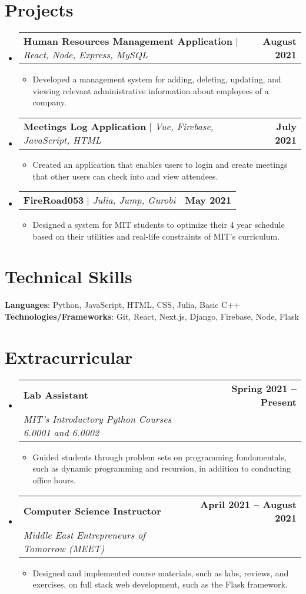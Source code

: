 \documentclass[letterpaper,11pt]{article}
\makeatletter
\newcommand{\resumeItem}[1]{
  \item\small{
    {#1 \vspace{-2pt}}
  }
}
\newcommand{\resumeSubheading}[4]{
  \vspace{-2pt}\item
    \begin{tabular*}{1.0\textwidth}[t]{l@{\extracolsep{\fill}}r}
      \textbf{#1} & \textbf{\small #2} \\
      \textit{\small#3} & \textit{\small #4} \\
    \end{tabular*}\vspace{-7pt}
}
\newcommand{\resumeProjectHeading}[2]{
    \item
    \begin{tabular*}{1.001\textwidth}{l@{\extracolsep{\fill}}r}
      \small#1 & \textbf{\small #2}\\
    \end{tabular*}\vspace{-7pt}
}
\newcommand{\resumeSubHeadingListStart}{\begin{itemize}[leftmargin=0.0in, label={}]}
\newcommand{\resumeSubHeadingListEnd}{\end{itemize}}
\newcommand{\resumeItemListStart}{\begin{itemize}}
\newcommand{\resumeItemListEnd}{\end{itemize}\vspace{-5pt}}
\makeatother
\begin{document}
\section{Projects}
    \vspace{-5pt}
    \resumeSubHeadingListStart
      \resumeProjectHeading
          {\textbf{Human Resources Management Application} $|$ \emph{React, Node, Express, MySQL}}{August 2021}
          \resumeItemListStart
            \resumeItem{Developed a management system for adding, deleting, updating, and viewing relevant administrative information about employees of a company.}
          \resumeItemListEnd
          \vspace{-13pt}
      \resumeProjectHeading
          {\textbf{Meetings Log Application} $|$ \emph{Vue, Firebase, JavaScript, HTML}}{July 2021}
          \resumeItemListStart
            \resumeItem{Created an application that enables users to login and create meetings that other users can check into and view attendees.}
          \resumeItemListEnd 
          \vspace{-13pt}
          \resumeProjectHeading
          {\textbf{FireRoad053} $|$ \emph{Julia, Jump, Gurobi}}{May 2021}
          \resumeItemListStart
            \resumeItem{Designed a system for MIT students to optimize their 4 year schedule based on their utilities and real-life constraints of MIT's curriculum.}
          \resumeItemListEnd 
    \resumeSubHeadingListEnd
\vspace{-15pt}


%
\section{Technical Skills}
 \begin{itemize}[leftmargin=0.15in, label={}]
    \small{\item{
     \textbf{Languages}{: Python, JavaScript, HTML, CSS, Julia, Basic C++} \\
     \textbf{Technologies/Frameworks}{: Git, React, Next.js, Django, Firebase, Node, Flask} \\
    }}
 \end{itemize}
 \vspace{-16pt}


\section{Extracurricular}
    \resumeSubHeadingListStart
        \resumeSubheading{Lab Assistant}{Spring 2021 -- Present}{MIT's Introductory Python Courses 6.0001 and 6.0002}{}
            \resumeItemListStart
                \resumeItem{Guided students through problem sets on programming fundamentals, such as dynamic programming and recursion, in addition to conducting office hours.}
            \resumeItemListEnd
        \resumeSubheading{Computer Science Instructor}{April 2021 -- August 2021}{Middle East Entrepreneurs of Tomorrow (MEET)}{}
            \resumeItemListStart
                \resumeItem{Designed and implemented course materials, such as labs, reviews, and exercises, on full stack web development, such as the Flask framework.}
            \resumeItemListEnd
    \resumeSubHeadingListEnd
\end{document}
